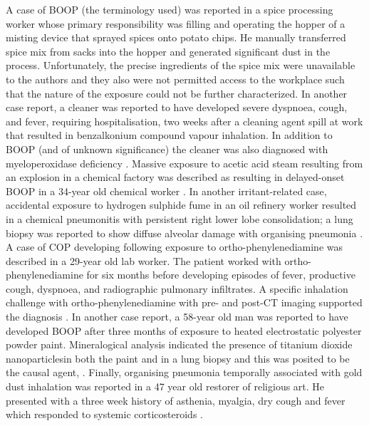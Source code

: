 \documentclass[a4paper,12pt]{article}
\begin{document}
A case of BOOP (the terminology used) was reported in a spice processing worker \cite{Alleman2002} whose primary responsibility was filling and operating the hopper of a misting device that sprayed spices onto potato chips. He manually transferred spice mix from sacks into the hopper and generated significant dust in the process. Unfortunately, the precise ingredients of the spice mix were unavailable to the authors and they also were not permitted access to the workplace such that the nature of the exposure could not be further characterized.  In another case report, a cleaner was reported to have developed severe dyspnoea, cough, and fever, requiring hospitalisation, two weeks after a cleaning agent spill at work that resulted in benzalkonium compound vapour inhalation. In addition to BOOP (and of unknown significance) the cleaner was also diagnosed with myeloperoxidase deficiency \cite{Stefano2003}. Massive exposure to acetic acid steam resulting from an explosion in a chemical factory was described as resulting in delayed-onset BOOP in a 34-year old chemical worker \cite{Sheu2008}. In another irritant-related case, accidental exposure to hydrogen sulphide fume in an oil refinery worker resulted in a chemical pneumonitis with persistent right lower lobe consolidation; a lung biopsy was reported to show diffuse alveolar damage with organising pneumonia \cite{Doujaiji2010}. A case of COP developing following exposure to ortho-phenylenediamine was described in a 29-year old lab worker. The patient worked with ortho-phenylenediamine for six months before developing episodes of fever, productive cough, dyspnoea, and radiographic pulmonary infiltrates. A specific inhalation challenge with ortho-phenylenediamine with pre- and post-CT imaging supported the diagnosis \cite{Sanchez-Ortiz2011}. In another case report, a 58-year old man was reported to have developed BOOP after three months of exposure to heated electrostatic polyester powder paint. Mineralogical analysis indicated the presence of titanium dioxide nanoparticlesin both the paint and in a lung biopsy and this was posited to be the causal agent,  \cite{Cheng2012}. Finally, organising pneumonia temporally associated with gold dust inhalation was reported in a 47 year old restorer of religious art. He presented with a three week history of asthenia, myalgia, dry cough and fever which responded to systemic corticosteroids \cite{Ribeiro2011}.
\end{document}
